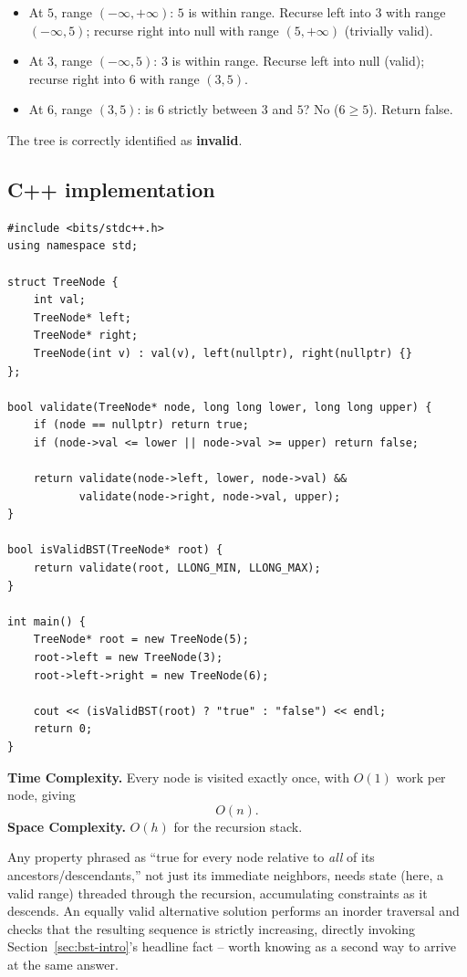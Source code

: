 \begin{itemize}
  \item At $5$, range $(-\infty,+\infty)$: $5$ is within range.
        Recurse left into $3$ with range $(-\infty,5)$; recurse right
        into null with range $(5,+\infty)$ (trivially valid).
  \item At $3$, range $(-\infty,5)$: $3$ is within range. Recurse left
        into null (valid); recurse right into $6$ with range $(3,5)$.
  \item At $6$, range $(3,5)$: is $6$ strictly between $3$ and $5$? No
        ($6 \ge 5$). Return false.
\end{itemize}

The tree is correctly identified as \textbf{invalid}.

\subsection*{C++ implementation}

\begin{lstlisting}
#include <bits/stdc++.h>
using namespace std;

struct TreeNode {
    int val;
    TreeNode* left;
    TreeNode* right;
    TreeNode(int v) : val(v), left(nullptr), right(nullptr) {}
};

bool validate(TreeNode* node, long long lower, long long upper) {
    if (node == nullptr) return true;
    if (node->val <= lower || node->val >= upper) return false;

    return validate(node->left, lower, node->val) &&
           validate(node->right, node->val, upper);
}

bool isValidBST(TreeNode* root) {
    return validate(root, LLONG_MIN, LLONG_MAX);
}

int main() {
    TreeNode* root = new TreeNode(5);
    root->left = new TreeNode(3);
    root->left->right = new TreeNode(6);

    cout << (isValidBST(root) ? "true" : "false") << endl;
    return 0;
}
\end{lstlisting}

\begin{complexitybox}
\textbf{Time Complexity.} Every node is visited exactly once, with
$O(1)$ work per node, giving
\[
  O(n).
\]
\textbf{Space Complexity.} $O(h)$ for the recursion stack.
\end{complexitybox}

\begin{takeawaybox}
Any property phrased as ``true for every node relative to \emph{all} of
its ancestors/descendants,'' not just its immediate neighbors, needs
state (here, a valid range) threaded through the recursion, accumulating
constraints as it descends. An equally valid alternative solution
performs an inorder traversal and checks that the resulting sequence is
strictly increasing, directly invoking
Section~\ref{sec:bst-intro}'s headline fact -- worth knowing as a second
way to arrive at the same answer.
\end{takeawaybox}

